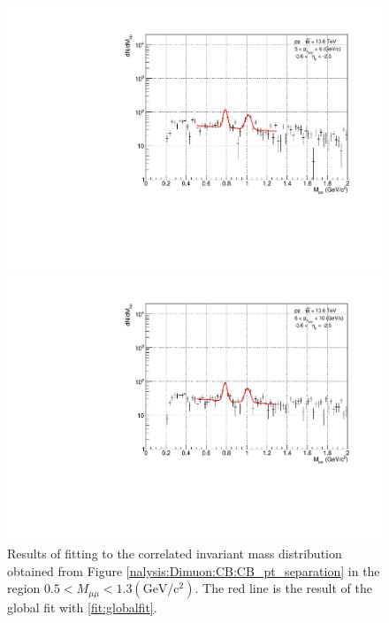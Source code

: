 \begin{figure}[H]
\begin{minipage}{0.45\textwidth}
                    \end{minipage}
                    \\
                    \vspace{1em}
                    \begin{minipage}{0.45\textwidth}
                        \centering
                        \includegraphics[width=\textwidth]{fig/3_4_2_fit_pt_5to6.pdf}
                        \captionsetup{labelformat=empty}
                        \caption*{$5 < p_{T\mu\mu} < 6 (\mathrm{GeV/c})$}
                    \end{minipage}
                    \hfill
                    \begin{minipage}{0.45\textwidth}
                        \centering
                        \includegraphics[width=\textwidth]{fig/3_4_2_fit_pt_6to10.pdf}
                        \captionsetup{labelformat=empty}
                        \caption*{$6 < p_{T\mu\mu} < 10 (\mathrm{GeV/c})$}
                    \end{minipage}
                    \caption{Results of fitting to the correlated invariant mass distribution obtained from Figure \ref{nalysis:Dimuon:CB:CB_pt_separation} in the region $0.5 < M_{\mu\mu} < 1.3 (\mathrm{GeV/c^2})$. The red line is the result of the global fit with \ref{fit:globalfit}.}
                    \label{Analysis:Dimuon:Yield:fit}
                \end{figure}

